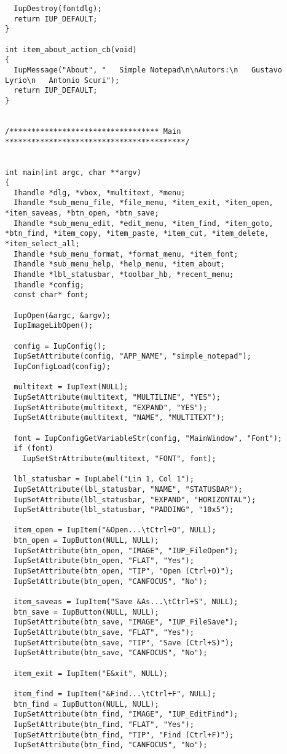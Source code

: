 \documentclass{ctexart}
\begin{document}
\begin{lstlisting}
  IupDestroy(fontdlg);
  return IUP_DEFAULT;
}

int item_about_action_cb(void)
{
  IupMessage("About", "   Simple Notepad\n\nAutors:\n   Gustavo Lyrio\n   Antonio Scuri");
  return IUP_DEFAULT;
}


/********************************** Main *****************************************/


int main(int argc, char **argv)
{
  Ihandle *dlg, *vbox, *multitext, *menu;
  Ihandle *sub_menu_file, *file_menu, *item_exit, *item_open, *item_saveas, *btn_open, *btn_save;
  Ihandle *sub_menu_edit, *edit_menu, *item_find, *item_goto, *btn_find, *item_copy, *item_paste, *item_cut, *item_delete, *item_select_all;
  Ihandle *sub_menu_format, *format_menu, *item_font;
  Ihandle *sub_menu_help, *help_menu, *item_about;
  Ihandle *lbl_statusbar, *toolbar_hb, *recent_menu;
  Ihandle *config;
  const char* font;

  IupOpen(&argc, &argv);
  IupImageLibOpen();

  config = IupConfig();
  IupSetAttribute(config, "APP_NAME", "simple_notepad");
  IupConfigLoad(config);

  multitext = IupText(NULL);
  IupSetAttribute(multitext, "MULTILINE", "YES");
  IupSetAttribute(multitext, "EXPAND", "YES");
  IupSetAttribute(multitext, "NAME", "MULTITEXT");

  font = IupConfigGetVariableStr(config, "MainWindow", "Font");
  if (font)
    IupSetStrAttribute(multitext, "FONT", font);

  lbl_statusbar = IupLabel("Lin 1, Col 1");
  IupSetAttribute(lbl_statusbar, "NAME", "STATUSBAR");  
  IupSetAttribute(lbl_statusbar, "EXPAND", "HORIZONTAL");
  IupSetAttribute(lbl_statusbar, "PADDING", "10x5");

  item_open = IupItem("&Open...\tCtrl+O", NULL);
  btn_open = IupButton(NULL, NULL);
  IupSetAttribute(btn_open, "IMAGE", "IUP_FileOpen");
  IupSetAttribute(btn_open, "FLAT", "Yes");
  IupSetAttribute(btn_open, "TIP", "Open (Ctrl+O)");
  IupSetAttribute(btn_open, "CANFOCUS", "No");

  item_saveas = IupItem("Save &As...\tCtrl+S", NULL);
  btn_save = IupButton(NULL, NULL);
  IupSetAttribute(btn_save, "IMAGE", "IUP_FileSave");
  IupSetAttribute(btn_save, "FLAT", "Yes");
  IupSetAttribute(btn_save, "TIP", "Save (Ctrl+S)");
  IupSetAttribute(btn_save, "CANFOCUS", "No");

  item_exit = IupItem("E&xit", NULL);

  item_find = IupItem("&Find...\tCtrl+F", NULL);
  btn_find = IupButton(NULL, NULL);
  IupSetAttribute(btn_find, "IMAGE", "IUP_EditFind");
  IupSetAttribute(btn_find, "FLAT", "Yes");
  IupSetAttribute(btn_find, "TIP", "Find (Ctrl+F)");
  IupSetAttribute(btn_find, "CANFOCUS", "No");


\end{lstlisting}
\end{document}
